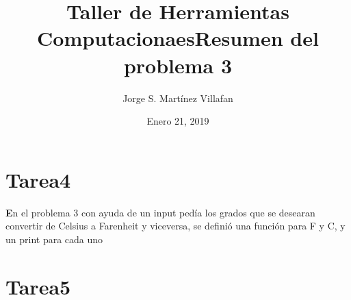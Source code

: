 \documentclass[letterpaper, 12pt, oneside]{article}%
\title{\Huge Taller de Herramientas Computacionaes}
\author{Jorge S. Martínez Villafan}
\date{Enero 21, 2019}
\begin{document}
\maketitle
\newpage
\title{Resumen del problema 3}
\section{Tarea4}
\textbf En el problema 3 con ayuda de un input pedía los grados que se desearan convertir de Celsius a Farenheit y viceversa, se definió  una función para F y C, y un print para cada uno


\section{Tarea5}
\end{document}
